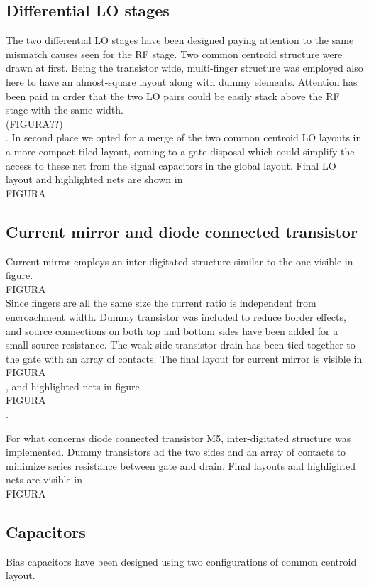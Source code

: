 \subsection{Differential LO stages}
The two differential LO stages have been designed paying attention to the same mismatch causes seen for the RF stage. Two common centroid structure were drawn at first. Being the transistor wide, multi-finger structure was employed also here to have an almost-square layout along with dummy elements. Attention has been paid in order that the two LO pairs could be easily stack above the RF stage with the same width. \\(FIGURA??)\\. In second place we opted for a merge of the two common centroid LO layouts in a more compact tiled layout, coming to a gate disposal which could simplify the access to these net from the signal capacitors in the global layout. Final LO layout and highlighted nets are shown in \\FIGURA\\

\subsection{Current mirror and diode connected transistor}
Current mirror employs an inter-digitated structure similar to the one visible in figure. \\FIGURA\\ Since fingers are all the same size the current ratio is independent from encroachment width. Dummy transistor was included to reduce border effects, and source connections on both top and bottom sides have been added for a small source resistance. The weak side transistor drain has been tied together to the gate with an array of contacts. The final layout for current mirror is visible in \\FIGURA\\, and highlighted nets in figure \\FIGURA\\.

For what concerns diode connected transistor M5, inter-digitated structure was implemented. Dummy transistors ad the two sides and an array of contacts to minimize series resistance between gate and drain. Final layouts and highlighted nets are visible in \\FIGURA\\

\subsection{Capacitors}
Bias capacitors have been designed using two configurations of common centroid layout.
